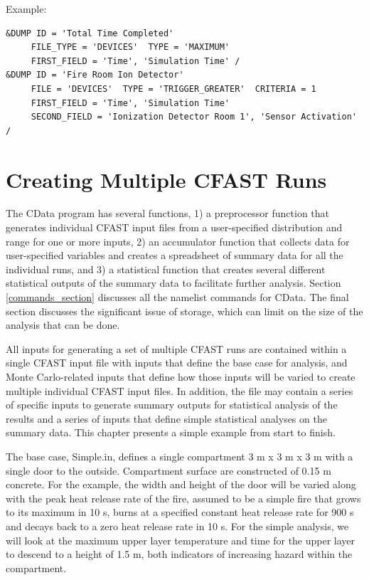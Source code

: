 \documentclass[12pt,twoside]{book}
\begin{document}
\vspace{\baselineskip}
\noindent Example:
\begin{lstlisting}
&DUMP ID = 'Total Time Completed'
     FILE_TYPE = 'DEVICES'  TYPE = 'MAXIMUM'
     FIRST_FIELD = 'Time', 'Simulation Time' /
&DUMP ID = 'Fire Room Ion Detector'
     FILE = 'DEVICES'  TYPE = 'TRIGGER_GREATER'  CRITERIA = 1
     FIRST_FIELD = 'Time', 'Simulation Time'
     SECOND_FIELD = 'Ionization Detector Room 1', 'Sensor Activation' /
\end{lstlisting}

\clearpage

%
%


\chapter{Creating Multiple CFAST Runs}
The CData program has several functions, 1) a preprocessor function that generates individual CFAST input files from a user-specified distribution and range for one or more inputs, 2) an accumulator function that collects  data for user-specified variables and creates a spreadsheet of summary data for all the individual runs, and 3) a statistical function that creates several different statistical outputs of the summary data to facilitate further analysis.  Section \ref{commands_section} discusses all the namelist commands for CData. The final section discusses the significant issue of storage, which can limit on the size of the analysis that can be done.

All inputs for generating a set of multiple CFAST runs are contained within a single CFAST input file with inputs that define the base case for analysis, and Monte Carlo-related inputs that define how those inputs will be varied to create multiple individual CFAST input files. In addition, the file may contain a series of specific inputs to generate summary outputs for statistical analysis of the results and a series of inputs that define simple statistical analyses on the summary data.  This chapter presents a simple example from start to finish.

The base case, {\ct Simple.in}, defines a single compartment 3 m x 3 m x 3 m with a single door to the outside.  Compartment surface are constructed of 0.15 m concrete. For the example, the width and height of the door will be varied along with the peak heat release rate of the fire, assumed to be a simple fire that grows to its maximum in 10 s, burns at a specified constant heat release rate for 900 s and decays back to a zero heat release rate in 10 s. For the simple analysis, we will look at the maximum upper layer temperature and time for the upper layer to descend to a height of 1.5 m, both indicators of increasing hazard within the compartment.
\end{document}
